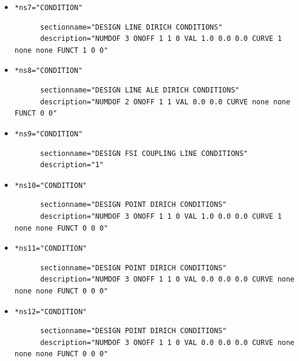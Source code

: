 \begin{itemize}
  \item \verb|*ns7="CONDITION"| \qquad
  \begin{small} \begin{verbatim}
      sectionname="DESIGN LINE DIRICH CONDITIONS"
      description="NUMDOF 3 ONOFF 1 1 0 VAL 1.0 0.0 0.0 CURVE 1 none none FUNCT 1 0 0"
    \end{verbatim}
   \end{small}
   
  \item \verb|*ns8="CONDITION"| \qquad
  \begin{small} \begin{verbatim}
      sectionname="DESIGN LINE ALE DIRICH CONDITIONS"
      description="NUMDOF 2 ONOFF 1 1 VAL 0.0 0.0 CURVE none none FUNCT 0 0"
    \end{verbatim}
   \end{small}
   
  \item \verb|*ns9="CONDITION"| \qquad
  \begin{small} \begin{verbatim}
      sectionname="DESIGN FSI COUPLING LINE CONDITIONS"
      description="1"
    \end{verbatim}
   \end{small}
   
  \item \verb|*ns10="CONDITION"| \qquad
  \begin{small} \begin{verbatim}
      sectionname="DESIGN POINT DIRICH CONDITIONS"
      description="NUMDOF 3 ONOFF 1 1 0 VAL 1.0 0.0 0.0 CURVE 1 none none FUNCT 0 0 0"
    \end{verbatim}
   \end{small}
   
  \item \verb|*ns11="CONDITION"| \qquad
  \begin{small} \begin{verbatim}
      sectionname="DESIGN POINT DIRICH CONDITIONS"
      description="NUMDOF 3 ONOFF 1 1 0 VAL 0.0 0.0 0.0 CURVE none none none FUNCT 0 0 0"
    \end{verbatim}
   \end{small}

  \item \verb|*ns12="CONDITION"| \qquad
  \begin{small} \begin{verbatim}
      sectionname="DESIGN POINT DIRICH CONDITIONS"
      description="NUMDOF 3 ONOFF 1 1 0 VAL 0.0 0.0 0.0 CURVE none none none FUNCT 0 0 0"
    \end{verbatim}
   \end{small}


\end{itemize}
